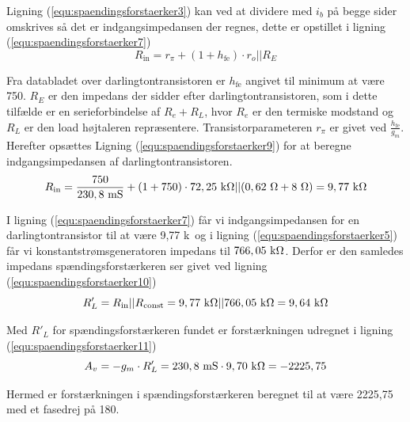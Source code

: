 Ligning (\ref{equ:spaendingsforstaerker3}) kan ved at dividere med $i_b$ på begge sider omskrives så det er indgangsimpedansen der regnes, dette er opstillet i ligning (\ref{equ:spaendingsforstaerker7})
\begin{equation}
\label{equ:spaendingsforstaerker7}
R_{\mathrm{in}} = r_{\pi} + (1+h_{\mathrm{fe}}) \cdot r_o||R_E 
\end{equation}

Fra databladet over darlingtontransistoren er $h_{\mathrm{fe}}$ angivet til minimum at være 750.  $R_E$ er den impedans der sidder efter darlingtontransistoren, som i dette tilfælde er en serieforbindelse af $R_e + R_L$, hvor $R_e$ er den termiske modstand og $R_L$ er den load højtaleren repræsentere. Transistorparameteren $r_{\pi}$ er givet ved $\frac{h_{\mathrm{fe}}}{g_m}$. Herefter opsættes Ligning (\ref{equ:spaendingsforstaerker9}) for at beregne indgangsimpedansen af darlingtontransistoren.
\begin{equation}
\label{equ:spaendingsforstaerker9}
R_{\mathrm{in}} = \frac{750}{230,8~\mathrm{mS}} + ( 1 + 750 ) \cdot 72,25~\mathrm{k}\ohm || (0,62~\ohm + 8~\ohm) = 9,77~\mathrm{k}\ohm  
\end{equation}

I ligning (\ref{equ:spaendingsforstaerker7}) får vi indgangsimpedansen for en darlingtontransistor til at være 9,77 k\ohm~og i ligning (\ref{equ:spaendingsforstaerker5}) får vi konstantstrømsgeneratoren impedans til $766,05~\mathrm{k}\ohm$. Derfor er den samledes impedans spændingsforstærkeren ser givet ved ligning (\ref{equ:spaendingsforstaerker10})
\begin{equation}
\label{equ:spaendingsforstaerker10}
R'_L = R_{\mathrm{in}}||R_{\mathrm{const}} = 9,77~\mathrm{k}\ohm || 766,05~\mathrm{k}\ohm = 9,64~\mathrm{k}\ohm
\end{equation}  

Med $R'_L$ for spændingsforstærkeren fundet er forstærkningen udregnet i ligning (\ref{equ:spaendingsforstaerker11})
\begin{equation}
\label{equ:spaendingsforstaerker11}
A_v = -g_m \cdot R'_L = 230,8~\mathrm{mS} \cdot 9,70~\mathrm{k}\ohm = -2225,75
\end{equation}

Hermed er forstærkningen i spændingsforstærkeren beregnet til at være 2225,75 med et fasedrej på 180\degree .